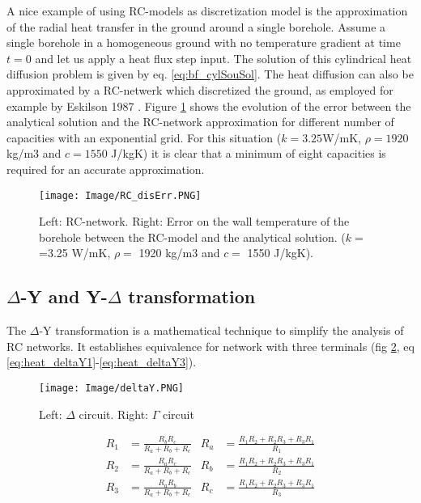\documentclass[a4paper,oneside,11pt]{report}
\begin{document}
A nice example of using RC-models as discretization model is the approximation of the radial heat transfer in the ground around a single borehole. Assume a single borehole in a homogeneous ground with no temperature gradient at time $t=0$ and let us apply a heat flux step input. The solution of this cylindrical heat diffusion problem is given by eq. \ref{eq:bf_cylSouSol}. The heat diffusion can also be approximated by a RC-netwerk which discretized the ground, as employed for example by Eskilson 1987 \cite{esk87}. Figure \ref{fig:heat_rcErr} shows the evolution of the error between the analytical solution and the RC-network approximation for different number of capacities with an exponential grid. For this situation ($k = 3.25 $W/mK, $\rho = 1920$ kg/m3 and $c = 1550$ J/kgK) it is clear that a minimum of eight capacities is required for an accurate approximation.

\begin{figure}[hbtp] 
	\centering
	\texttt{[image: Image/RC\_disErr.PNG]}
	\caption{ Left: RC-network. Right: Error on the wall temperature of the borehole between the RC-model and the analytical solution. ($k =$=3.25 W/mK, $\rho =$ 1920 kg/m3 and $c =$ 1550 J/kgK).}
	\label{fig:heat_rcErr}
\end{figure}

	\subsection{$\Delta$-Y and Y-$\Delta$ transformation} \label{ssec:heat_delY}
The $\Delta$-Y transformation is a mathematical technique to simplify the analysis of RC networks. It establishes equivalence for network with three terminals (fig \ref{fig:heat_deltaY}, eq \ref{eq:heat_deltaY1}-\ref{eq:heat_deltaY3}).

\begin{figure}[hbtp] 
	\centering
	\texttt{[image: Image/deltaY.PNG]}
	\caption{ Left: $\Delta$ circuit. Right: $\Gamma$ circuit }
	\label{fig:heat_deltaY}
\end{figure}

\begin{align} 
	R_1 &= \frac{R_b R_c}{R_a + R_b + R_c} & R_a &= \frac{ R_1 R_2 + R_2 R_3 + R_3 R_1}{R_1} \label{eq:heat_deltaY1}\\
	R_2 &= \frac{R_a R_c}{R_a + R_b + R_c} & R_b &= \frac{ R_1 R_2 + R_2 R_3 + R_3 R_1}{R_2} \label{eq:heat_deltaY2}\\
	R_3 &= \frac{R_a R_b}{R_a + R_b + R_c} & R_c &= \frac{ R_1 R_2 + R_2 R_3 + R_3 R_1}{R_3} \label{eq:heat_deltaY3}
\end{align}
\end{document}
